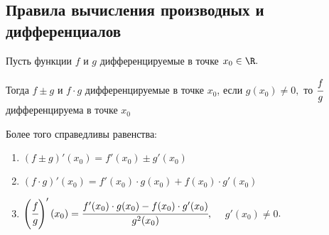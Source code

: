 \subsection{Правила вычисления производных и дифференциалов}
\begin{theorem} \hypertarget{thrm5.3}{}
    Пусть функции $f$ и $g$ дифференцируемые в точке $x_{0}\in \R.$

    Тогда $f \pm g$ и $ f\cdot g$ дифференцируемые в точке $x_{0}$, если $g(x_{0}) \neq 0,$ то $\cfrac{f}{g}$ дифференцируема в точке $x_{0}$

    Более того справедливы равенства: 
    \begin{enumerate}
        \item $(f \pm g)'(x_{0}) = f'(x_{0}) \pm g'({x_{0}}) $
        \item $(f \cdot g)'(x_{0}) = f'(x_{0}) \cdot g({x_{0}}) + f(x_{0}) \cdot g'({x_{0}})$
        \item $\left(\cfrac{f}{g}\right)' (x_{0}) = \cfrac{f'(x_{0}) \cdot g({x_{0}}) - f(x_{0}) \cdot g'({x_{0}})}{g^{2}(x_{0})}, \quad$ $g'(x_{0}) \neq 0$.
    \end{enumerate}
\end{theorem}
